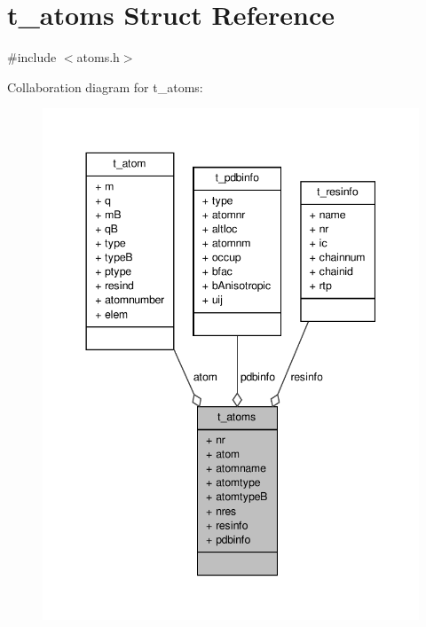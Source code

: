\hypertarget{structt__atoms}{\section{t\-\_\-atoms \-Struct \-Reference}
\label{structt__atoms}
}


{\ttfamily \#include $<$atoms.\-h$>$}



\-Collaboration diagram for t\-\_\-atoms\-:
\nopagebreak
\begin{figure}[H]
\begin{center}
\leavevmode
\includegraphics[width=344pt]{structt__atoms__coll__graph}
\end{center}
\end{figure}
